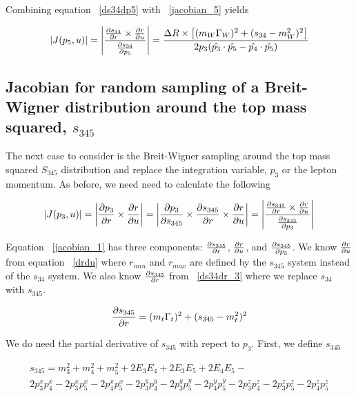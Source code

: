 Combining equation ~\ref{ds34dp5} with ~\ref{jacobian_5} yields

\begin{equation}
\label{jacobian_6}
|J(p_{5}, u)| = \left | \frac{\frac{\partial s_{34}}{\partial r} \times
\frac{\partial r}{\partial u}}{\frac{\partial s_{34}}{\partial p_{5}}} \right | = \frac{\Delta R \times \left[
(m_{W}\Gamma_{W})^{2} + (s_{34} - m_{W}^{2})^{2} \right]}{2p_{3}(\hat{p_{3}} \cdot \hat{p_{5}} - \hat{p_{4}} \cdot \hat{p_{5}})}
\end{equation}



%
%



\subsection{Jacobian for random sampling of a Breit-Wigner distribution around
the top mass squared, $s_{345}$}

The next case to consider is the Breit-Wigner sampling around the top mass squared
$S_{345}$ distribution and replace the integration variable, $p_{3}$ or the
lepton momentum. As before, we need need to calculate the following

\begin{equation}
\label{jacobian_1}
|J(p_{3}, u)| = \left| \frac{\partial p_{3}}{\partial r} \times \frac{\partial r}{\partial u} \right| = \left|
\frac{\partial p_{3}}{\partial s_{345}} \times \frac{\partial s_{345}}{\partial r} \times \frac{\partial r}{\partial u} \right| =
\left | \frac{\frac{\partial s_{345}}{\partial r} \times
\frac{\partial r}{\partial u}}{\frac{\partial s_{345}}{\partial p_{3}}} \right |
\end{equation}

Equation ~\ref{jacobian_1} has three components: $\frac{\partial s_{345}}{\partial r}$,
$\frac{\partial r}{\partial u}$, and $\frac{\partial s_{345}}{\partial p_{3}}$. We know $\frac{\partial r}{\partial u}$ from
equation ~\ref{drdu} where $r_{min}$ and $r_{max}$ are defined by the $s_{345}$
system instead of the $s_{34}$ system. We also know $\frac{\partial s_{345}}{\partial r}$ from ~\ref{ds34dr_3}
where we replace $s_{34}$ with $s_{345}$.

\begin{equation}
\label{ds345dr}
\frac{\partial s_{345}}{\partial r} = (m_{t}\Gamma_{t})^{2} + (s_{345} - m_{t}^{2})^{2}
\end{equation}

We do need the partial derivative of $s_{345}$ with repect to
$p_{3}$. First, we define $s_{345}$

\begin{eqnarray}
\label{defines345}
\nonumber
s_{345} = m_{3}^{2} + m_{4}^{2} + m_{5}^{2} + 2E_{3}E_{4} + 2E_{3}E_{5} +
2E_{4}E_{5} - \\
2p_{3}^{x}p_{4}^{x} - 2p_{3}^{x}p_{5}^{x} - 2p_{4}^{x}p_{5}^{x} -
2p_{3}^{y}p_{4}^{y} - 2p_{3}^{y}p_{5}^{y} - 2p_{4}^{y}p_{5}^{y} -
2p_{3}^{z}p_{4}^{z} - 2p_{3}^{z}p_{5}^{z} - 2p_{4}^{z}p_{5}^{z}
\end{eqnarray}

